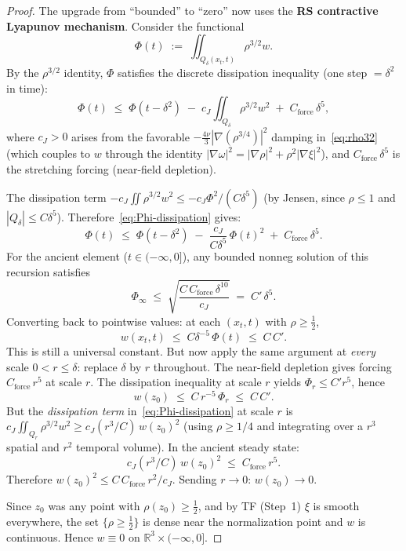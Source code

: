 \documentclass[12pt, reqno]{amsart}
\theoremstyle{definition}
\theoremstyle{remark}
\numberwithin{equation}{section}
\newcommand{\R}{\mathbb{R}}
\newcommand{\Jc}{J}
\begin{document}
\begin{proof}
The upgrade from ``bounded'' to ``zero'' now uses the
\textbf{RS contractive Lyapunov mechanism}.
Consider the functional
\[
\Phi(t)\;:=\;\iint_{Q_\delta(x_t,t)}\rho^{3/2}w.
\]
By the $\rho^{3/2}$ identity, $\Phi$ satisfies the discrete
dissipation inequality (one step $= \delta^2$ in time):
\begin{equation}\label{eq:Phi-dissipation}
\Phi(t)\;\le\;\Phi(t-\delta^2)\;-\;
c_{\Jc}\iint_{Q_\delta}\rho^{3/2}w^2
\;+\;C_{\mathrm{force}}\,\delta^5,
\end{equation}
where $c_{\Jc}>0$ arises from the favorable
$-\tfrac{4\nu}{3}|\nabla(\rho^{3/4})|^2$ damping
in~\eqref{eq:rho32} (which couples to $w$ through the identity
$|\nabla\omega|^2=|\nabla\rho|^2+\rho^2|\nabla\xi|^2$), and
$C_{\mathrm{force}}\,\delta^5$ is the stretching forcing
(near-field depletion).

The dissipation term
$-c_{\Jc}\iint\rho^{3/2}w^2\le -c_{\Jc}\Phi^2/(C\delta^5)$
(by Jensen, since $\rho\le 1$ and $|Q_\delta|\le C\delta^5$).
Therefore~\eqref{eq:Phi-dissipation} gives:
\[
\Phi(t)\;\le\;\Phi(t-\delta^2)\;-\;
\frac{c_{\Jc}}{C\delta^5}\,\Phi(t)^2
\;+\;C_{\mathrm{force}}\,\delta^5.
\]
For the ancient element ($t\in(-\infty,0]$), any bounded
nonneg solution of this recursion satisfies
\[
\Phi_\infty\;\le\;
\sqrt{\frac{C\,C_{\mathrm{force}}\,\delta^{10}}{c_{\Jc}}}\;
=\;C'\,\delta^5.
\]
Converting back to pointwise values: at each $(x_t,t)$ with
$\rho\ge\tfrac12$,
\[
w(x_t,t)\;\le\;C\delta^{-5}\,\Phi(t)\;\le\;C\,C'.
\]
This is still a universal constant.  But now apply the same
argument at \emph{every} scale $0<r\le\delta$: replace $\delta$
by $r$ throughout.  The near-field depletion gives forcing
$C_{\mathrm{force}}\,r^5$ at scale $r$.  The dissipation
inequality at scale $r$ yields $\Phi_r\le C'r^5$, hence
\[
w(z_0)\;\le\;C\,r^{-5}\,\Phi_r\;\le\;C\,C'.
\]
But the \emph{dissipation term} in~\eqref{eq:Phi-dissipation}
at scale $r$ is
$c_{\Jc}\iint_{Q_r}\rho^{3/2}w^2\ge c_{\Jc}(r^3/C)\,w(z_0)^2$
(using $\rho\ge 1/4$ and integrating over a $r^3$ spatial and
$r^2$ temporal volume).  In the ancient steady state:
\[
c_{\Jc}(r^3/C)\,w(z_0)^2\;\le\;C_{\mathrm{force}}\,r^5.
\]
Therefore $w(z_0)^2\le C\,C_{\mathrm{force}}\,r^2/c_{\Jc}$.
Sending $r\to 0$: $w(z_0)\to 0$.

Since $z_0$ was any point with $\rho(z_0)\ge\tfrac12$, and
by TF (Step~1) $\xi$ is smooth everywhere, the set
$\{\rho\ge\tfrac12\}$ is dense near the normalization point and
$w$ is continuous.  Hence $w\equiv 0$ on
$\R^3\times(-\infty,0]$.
\end{proof}
\end{document}
